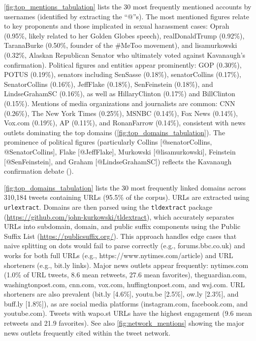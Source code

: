 \documentclass[manuscript,screen,nonacm,11pt,acm]{acmart}
\begin{document}
\begin{bibunit}
\cref{fig:top_mentions_tabulation} lists the 30 most frequently mentioned accounts by usernames (identified by extracting the ``@''s).
The most mentioned figures relate to key proponents and those implicated in sexual harassment cases: Oprah (0.95\%, likely related to her Golden Globes speech), realDonaldTrump (0.92\%), TaranaBurke (0.50\%, founder of the \#MeToo movement), and lisamurkowski (0.32\%, Alaskan Republican Senator who ultimately voted against Kavanaugh's confirmation).
Political figures and entities appear prominently: GOP (0.30\%), POTUS (0.19\%), senators including SenSasse (0.18\%), senatorCollins (0.17\%), SenatorCollins (0.16\%), JeffFlake (0.18\%), SenFeinstein (0.18\%), and LindseGrahamSC (0.16\%), as well as HillaryClinton (0.17\%) and BillClinton (0.15\%).
Mentions of media organizations and journalists are common: CNN (0.26\%), The New York Times (0.25\%), MSNBC (0.14\%), Fox News (0.14\%), Vox.com (0.19\%), AP (0.11\%), and RonanFarrow (0.14\%), consistent with news outlets dominating the top domains (\cref{fig:top_domains_tabulation}).
The prominence of political figures (particularly Collins [@senatorCollins, @SenatorCollins], Flake [@JeffFlake], Murkowski [@lisamurkowski], Feinstein [@SenFeinstein], and Graham [@LindseGrahamSC]) reflects the Kavanaugh confirmation debate ().

\cref{fig:top_domains_tabulation} lists the 30 most frequently linked domains across 310,184 tweets containing URLs (95.5\% of the corpus).
URLs are extracted using \texttt{urlextract}.
Domains are then parsed using the \texttt{tldextract} package (\url{https://github.com/john-kurkowski/tldextract}), which accurately separates URLs into subdomain, domain, and public suffix components using the Public Suffix List (\url{https://publicsuffix.org/}).
This approach handles edge cases that naive splitting on dots would fail to parse correctly (e.g., forums.bbc.co.uk) and works for both full URLs (e.g., https://www.nytimes.com/article) and URL shorteners (e.g., bit.ly links).
Major news outlets appear frequently: nytimes.com (1.0\% of URL tweets, 8.6 mean retweets, 27.6 mean favorites), theguardian.com, washingtonpost.com, cnn.com, vox.com, huffingtonpost.com, and wsj.com.
URL shorteners are also prevalent (bit.ly [4.6\%], youtu.be [2.5\%], ow.ly [2.3\%], and buff.ly [1.8\%]), as are social media platforms (instagram.com, facebook.com, and youtube.com).
Tweets with wapo.st URLs have the highest engagement (9.6 mean retweets and 21.9 favorites).
See also \cref{fig:network_mentions} showing the major news outlets frequently cited within the tweet network.


\end{bibunit}
\end{document}
